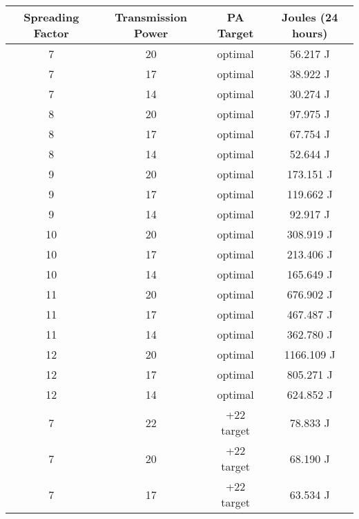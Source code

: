  \begin{table*}[ht]
    \centering
    \small
    \begin{tabularx}{\columnwidth}{c c c c}
    \toprule
    Spreading Factor & Transmission Power & PA Target & Joules (24 hours) \\
    \midrule
    7 & 20 & optimal & 56.217 J \\
    
    7 & 17 & optimal & 38.922 J \\
    
    7 & 14 & optimal & 30.274 J \\
    \midrule
    8 & 20 & optimal & 97.975 J \\
    
    8 & 17 & optimal & 67.754 J \\
    
    8 & 14 & optimal & 52.644 J \\
    \midrule
    9 & 20 & optimal & 173.151 J \\
    
    9 & 17 & optimal & 119.662 J \\
    
    9 & 14 & optimal & 92.917 J \\
    \midrule
    10 & 20 & optimal & 308.919 J \\
    
    10 & 17 & optimal & 213.406 J \\
    
    10 & 14 & optimal & 165.649 J \\
    \midrule
    11 & 20 & optimal & 676.902 J \\
    
    11 & 17 & optimal & 467.487 J \\
    
    11 & 14 & optimal & 362.780 J \\
    \midrule
    12 & 20 & optimal & 1166.109 J \\
    
    12 & 17 & optimal & 805.271 J \\
    
    12 & 14 & optimal & 624.852 J \\
    \midrule
    7 & 22 & +22 target & 78.833 J \\
    
    7 & 20 & +22 target & 68.190 J \\
    
    7 & 17 & +22 target & 63.534 J \\
    

\end{tabularx}
\end{table*}
